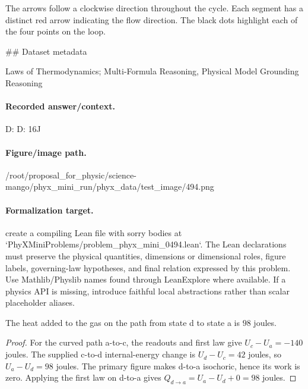 The arrows follow a clockwise direction throughout the cycle. Each segment has a distinct red arrow indicating the flow direction. The black dots highlight each of the four points on the loop.

\#\# Dataset metadata

Laws of Thermodynamics; Multi-Formula Reasoning, Physical Model Grounding Reasoning

\paragraph{Recorded answer/context.}
D: D: 16J

\paragraph{Figure/image path.}
/root/proposal\_for\_physic/science-mango/phyx\_mini\_run/phyx\_data/test\_image/494.png

\paragraph{Formalization target.}
create a compiling Lean file with sorry bodies at `PhyXMiniProblems/problem\_phyx\_mini\_0494.lean`. The Lean declarations must preserve the physical quantities, dimensions or dimensional roles, figure labels, governing-law hypotheses, and final relation expressed by this problem.
Use Mathlib/Physlib names found through LeanExplore where available. If a physics API is missing, introduce faithful local abstractions rather than scalar placeholder aliases.

\begin{theorem}
\label{thm:physics:phyx_mini_0494:target}
The heat added to the gas on the path from state d to state a is $98$ joules.
\end{theorem}
\begin{proof}
For the curved path a-to-c, the readouts and first law give $U_c-U_a=-140$ joules.  The supplied c-to-d internal-energy change is $U_d-U_c=42$ joules, so $U_a-U_d=98$ joules.  The primary figure makes d-to-a isochoric, hence its work is zero.  Applying the first law on d-to-a gives $Q_{d\to a}=U_a-U_d+0=98$ joules.
\end{proof}


